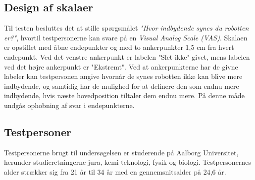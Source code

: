 \subsection*{Design af skalaer}
%
Til testen besluttes det at stille spørgsmålet \textit{"Hvor indbydende synes du robotten er?"}, hvortil testpersonerne kan svare på en \textit{Visual Analog Scale (VAS)}. Skalaen er opstillet med åbne endepunkter og med to ankerpunkter 1,5 cm fra hvert endepunkt. Ved det venstre ankerpunkt er labelen "Slet ikke" givet, mens labelen ved det højre ankerpunkt er "Ekstremt". Ved at ankerpunkterne har de givne labeler kan testpersonen angive hvornår de synes robotten ikke kan blive mere indbydende, og samtidig har de mulighed for at definere den som endnu mere indbydende, hvis næste hovedposition tiltaler dem endnu mere. På denne måde undgås ophobning af svar i endepunkterne.


\subsection*{Testpersoner}
%
Testpersonerne brugt til undersøgelsen er studerende på Aalborg Universitet, herunder studieretningerne jura, kemi-teknologi, fysik og biologi. Testpersonernes alder strækker sig fra 21 år til 34 år med en gennemsnitsalder på 24,6 år.
